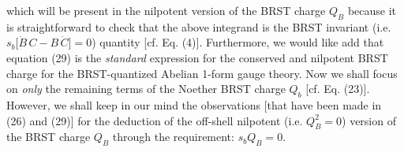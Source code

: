\documentclass[12pt]{article}
\begin{document}
which will be present in the nilpotent version of the BRST charge $Q_B$ because it is straightforward to check that the above integrand is the BRST invariant
(i.e. $s_b \big [\dot B \, C- B \, \dot C \big ] = 0$) quantity [cf. Eq. (4)]. 
Furthermore, we would like add that equation (29) is the {\it standard} expression for the
conserved and nilpotent BRST charge for the BRST-quantized Abelian 1-form gauge theory. Now we shall focus
on {\it only} the remaining terms of the Noether BRST charge $Q_b$ [cf. Eq. (23)]. However, we shall keep in our mind the observations [that have been
made in (26) and (29)] for the deduction of the off-shell nilpotent (i.e. $Q_B^2 = 0$)
version of the BRST charge $Q_B$ through the requirement: $s_b Q_B = 0$.
\end{document}
